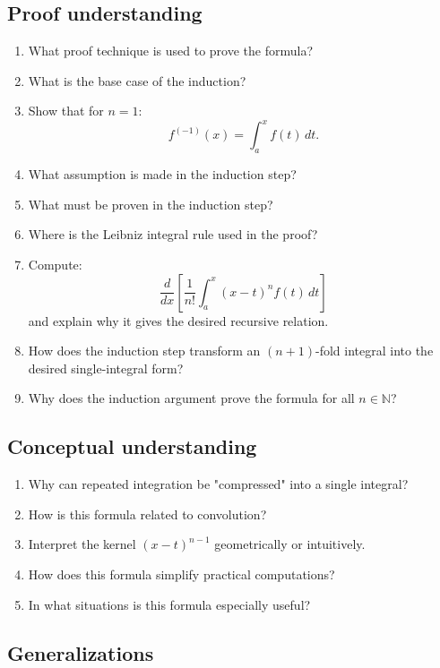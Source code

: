 \subsection{Proof understanding}

\begin{enumerate}[resume]
  \item What proof technique is used to prove the formula?
  \item What is the base case of the induction?
  \item Show that for $n=1$:
    \[
      f^{(-1)}(x) = \int_a^x f(t)\,dt.
    \]
  \item What assumption is made in the induction step?
  \item What must be proven in the induction step?
  \item Where is the Leibniz integral rule used in the proof?
  \item Compute:
    \[
      \frac{d}{dx} \left[ \frac{1}{n!} \int_a^x (x - t)^n f(t)\,dt \right]
    \]
    and explain why it gives the desired recursive relation.
  \item How does the induction step transform an $(n+1)$-fold integral into the desired single-integral form?
  \item Why does the induction argument prove the formula for all $n \in \mathbb{N}$?
\end{enumerate}

\subsection{Conceptual understanding}

\begin{enumerate}[resume]
  \item Why can repeated integration be "compressed" into a single integral?
  \item How is this formula related to convolution?
  \item Interpret the kernel $(x - t)^{n-1}$ geometrically or intuitively.
  \item How does this formula simplify practical computations?
  \item In what situations is this formula especially useful?
\end{enumerate}

\subsection{Generalizations}

